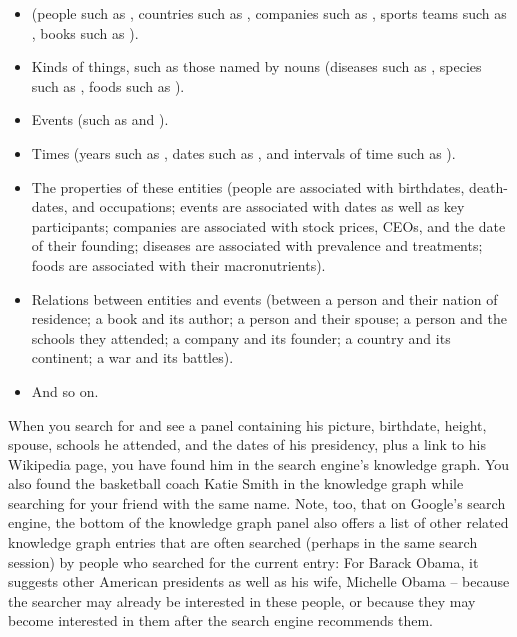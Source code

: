 \begin{itemize}
  \item {} (people such as , countries such as , companies such as , sports teams such as , books such as ).
  \item Kinds of things, such as those named by nouns (diseases such as , species such as , foods such as ).
  \item Events (such as  and ).
  \item Times (years such as , dates such as , and intervals of time such as ).
  \item The properties of these entities (people are associated with birthdates, death-dates, and occupations; events are associated with dates as well as key participants; companies are associated with stock prices, CEOs, and the date of  their founding; diseases are associated with prevalence and treatments; foods are associated with their macronutrients).
  \item Relations between entities and events (between a person and their nation of residence; a book and its author;  a person and their spouse;  a person and the schools they attended;  a company and its founder;  a country and its continent; a war and its battles).
  \item And so on.
\end{itemize}

When you search for  and see a panel containing his picture, birthdate, height, spouse, schools he attended, and the dates of his presidency, plus a link to his Wikipedia page, you have found him in the search engine's knowledge graph.  You also found the basketball coach Katie Smith in the knowledge graph while searching for your friend with the same name.  Note, too, that on Google's search engine, the bottom of the knowledge graph panel also offers a list of other related knowledge graph entries that are often searched (perhaps in the same search session) by people who  searched for the current entry: For Barack Obama, it suggests other American presidents as well as his wife, Michelle Obama -- because the searcher may already be interested in these people, or because they may become interested in them after the search engine recommends them.  

